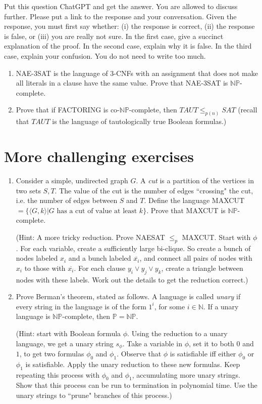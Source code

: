 \documentclass[11pt]{article}
\theoremstyle{definition}
\newcommand{\PTIME}{\mathbb{P}}
\newcommand{\NN}{\mathbb{N}}
\newcommand{\NP}{\mathbb{NP}}
\newcommand{\coNP}{\textrm{co-}\mathbb{NP}}
\begin{document}
Put this question ChatGPT and get the answer. You are allowed to discuss further. Please put a link to the response and your conversation. 
Given the response, you must first say whether: (i) the response is correct, (ii) the response is false, or (iii) you are really not sure.
In the first case, give a succinct explanation of the proof. In the second case, explain why it is false.
In the third case, explain your confusion. You do not need to write too much.

\begin{enumerate}
    \item NAE-3SAT is the language of 3-CNFs with an assignment that does not make all literals in a clause have the same value.
    Prove that NAE-3SAT is $\NP$-complete. 
    \item Prove that if FACTORING is $\coNP$-complete, then $TAUT \leq_{p(n)} SAT$ (recall
    that $TAUT$ is the language of tautologically true Boolean formulas.)
\end{enumerate}


\section{More challenging exercises}

\begin{enumerate}
    \item Consider a simple, undirected graph $G$. A \emph{cut} is a partition of the vertices in two sets $S, T$. The value of the cut
    is the number of edges ``crossing" the cut, i.e. the number of edges between $S$ and $T$. Define the language 
        MAXCUT $= \{\langle G, k\rangle | \textrm{$G$ has a cut of value at least $k$} \}$. Prove that MAXCUT is $\NP$-complete.

    (Hint: A more tricky reduction. Prove NAESAT $\leq_p$ MAXCUT. Start with $\phi$. For each variable, create a sufficiently large bi-clique. So create a bunch
    of nodes labeled $x_i$ and a bunch labeled $\overline{x_i}$, and connect all pairs of nodes with $x_i$ to those with $\overline{x_i}$. For each clause $y_i \vee y_j \vee y_k$,
    create a triangle between nodes with these labels. Work out the details to get the reduction correct.)
    \item Prove Berman's theorem, stated as follows. A language is called \emph{unary} if every string in the language is of the
    form $1^i$, for some $i \in \NN$. If a unary language is $\NP$-complete, then $\PTIME = \NP$.

    (Hint: start with Boolean formula $\phi$. Using the reduction to a unary language, we get a unary string $s_\phi$.
    Take a variable in $\phi$, set it to both $0$ and $1$, to get two formulas $\phi_0$ and $\phi_1$. Observe that $\phi$
    is satisfiable iff either $\phi_0$ or $\phi_1$ is satisfiable. Apply the unary reduction to these new formulas.
    Keep repeating this process with $\phi_0$ and $\phi_1$, accumulating more unary strings. Show that this
    process can be run to termination in polynomial time. Use the unary strings to ``prune" branches of this process.)



\end{enumerate}
\end{document}
